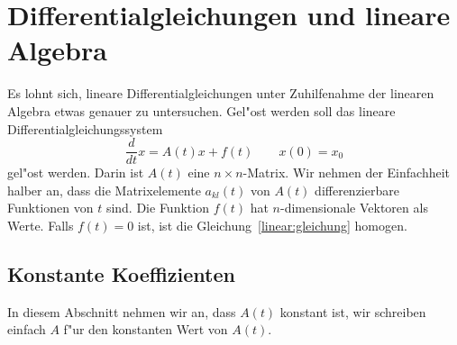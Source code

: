 %
%
%
\chapter{Differentialgleichungen und lineare Algebra\label{chapter:linear}}
\rhead{}
Es lohnt sich, lineare Differentialgleichungen unter Zuhilfenahme
der linearen Algebra etwas genauer zu untersuchen.
Gel"ost werden soll das lineare Differentialgleichungssystem
\begin{equation}
\frac{d}{dt}x = A(t)x + f(t)\qquad x(0)=x_0
\label{linear:gleichung}
\end{equation}
%
%
gel"ost werden.
Darin ist $A(t)$ eine $n\times n$-Matrix.
Wir nehmen der Einfachheit
halber an, dass die Matrixelemente $a_{kl}(t)$ von $A(t)$ differenzierbare
Funktionen von $t$ sind.
Die Funktion $f(t)$ hat $n$-dimensionale Vektoren als Werte.
Falls $f(t)=0$ ist, ist die Gleichung~\eqref{linear:gleichung}
homogen.

\section{Konstante Koeffizienten}
In diesem Abschnitt nehmen wir an, dass $A(t)$ konstant ist, wir schreiben
einfach $A$ f"ur den konstanten Wert von $A(t)$.
